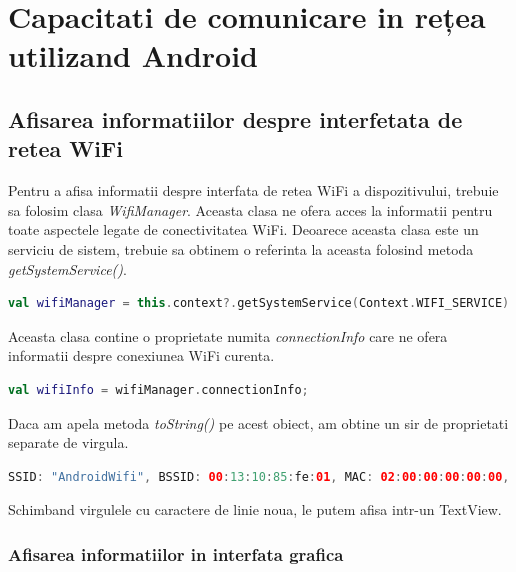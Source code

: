 \section{Capacitati de comunicare in rețea utilizand Android}

\subsection{Afisarea informatiilor despre interfetata de retea WiFi}
Pentru a afisa informatii despre interfata de retea WiFi a dispozitivului, trebuie sa folosim clasa \textit{WifiManager}.
Aceasta clasa ne ofera acces la informatii pentru toate aspectele legate de conectivitatea WiFi.
Deoarece aceasta clasa este un serviciu de sistem, trebuie sa obtinem o referinta la aceasta folosind metoda \textit{getSystemService()}.
\begin{lstlisting}[language=Kotlin]
    val wifiManager = this.context?.getSystemService(Context.WIFI_SERVICE) as WifiManager;
\end{lstlisting}
Aceasta clasa contine o proprietate numita \textit{connectionInfo} care ne ofera informatii despre conexiunea WiFi curenta.
\begin{lstlisting}[language=Kotlin]
    val wifiInfo = wifiManager.connectionInfo;
\end{lstlisting}
Daca am apela metoda \textit{toString()} pe acest obiect, am obtine un sir de proprietati separate de virgula.
\begin{lstlisting}[language=Kotlin]
    SSID: "AndroidWifi", BSSID: 00:13:10:85:fe:01, MAC: 02:00:00:00:00:00, IP: /10.0.2.16, Security type: 0, Supplicant state: COMPLETED, Wi-Fi standard: 1, RSSI: -50, Link speed: 1Mbps, Tx Link speed: 1Mbps, Max Supported Tx Link speed: 11Mbps, Rx Link speed: 2Mbps, Max Supported Rx Link speed: 11Mbps, Frequency: 2447MHz, Net ID: 0, Metered hint: false, score: 60, isUsable: true, CarrierMerged: false, SubscriptionId: -1, IsPrimary: -1, Trusted: true, Restricted: false, Ephemeral: false, OEM paid: false, OEM private: false, OSU AP: false, FQDN: <none>, Provider friendly name: <none>, Requesting package name: <none>"AndroidWifi"openMLO Information: , Is TID-To-Link negotiation supported by the AP: false, AP MLD Address: <none>, AP MLO Link Id: <none>, AP MLO Affiliated links: <none>
\end{lstlisting}
Schimband virgulele cu caractere de linie noua, le putem afisa intr-un TextView.
\subsubsection{Afisarea informatiilor in interfata grafica}
